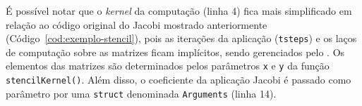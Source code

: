 
É possível notar que o \textit{kernel} da computação \stencil (linha 4) fica mais simplificado em relação ao
código original do Jacobi mostrado anteriormente (Código~\ref{cod:exemplo-stencil}), pois as iterações da aplicação
(\texttt{tsteps}) e os laços de computação sobre as matrizes ficam implícitos, sendo
gerenciados pelo \fw. Os elementos das matrizes são determinados pelos
parâmetros \texttt{x} e \texttt{y} da função \texttt{stencilKernel()}. Além disso, o coeficiente
da aplicação Jacobi é passado como parâmetro por uma \texttt{struct} denominada
\texttt{Arguments} (linha 14).


